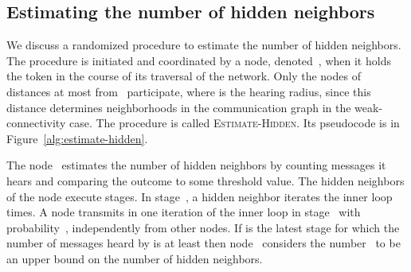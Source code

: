 \documentclass[11pt]{article}
\begin{document}
\subsection{Estimating the number of hidden neighbors}

\label{subsec:estimate-hidden-neighbors}



We discuss a randomized procedure to estimate the number of hidden neighbors.
The procedure is initiated and coordinated by a node, denoted~, when it holds the token in the course of its  traversal of the network.
Only the nodes of distances at most  from~ participate, where  is the hearing radius, since this distance determines neighborhoods in the communication graph in the weak-connectivity case. 
The procedure is called \textsc{Estimate-Hidden}.
Its pseudocode is in Figure~\ref{alg:estimate-hidden}.

The node~ estimates the number of hidden neighbors by counting messages it hears and comparing the outcome to some threshold value.
The hidden neighbors of the node  execute  stages. 
In stage~, a hidden neighbor iterates the inner loop  times.
A node transmits in one iteration of the inner loop in stage~ with probability~, independently from other nodes.
If  is the latest stage for which the number of messages heard by  is at least  then node~ considers the number~ to be an upper bound  on the number of hidden neighbors.
\end{document}
